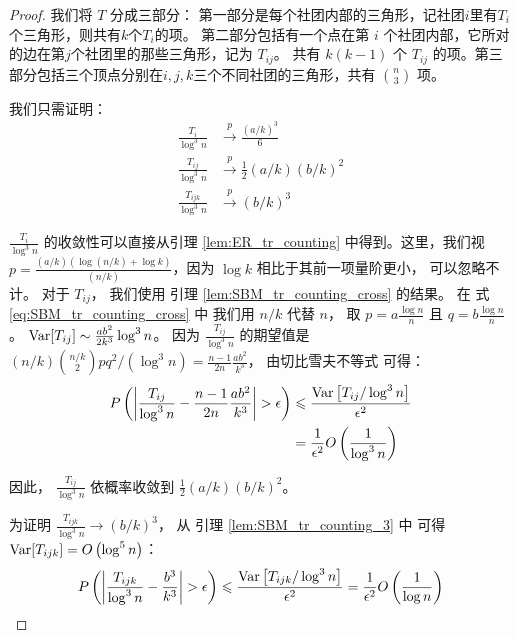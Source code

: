 \begin{proof}
 我们将 $T$ 分成三部分：
 第一部分是每个社团内部的三角形，记社团$i$里有$T_i$个三角形，则共有$k$个$T_i$的项。
 第二部分包括有一个点在第 $i$ 个社团内部，它所对的边在第$j$个社团里的那些三角形，记为 $T_{ij}$。
 共有 $k(k-1)$ 个 $T_{ij}$ 的项。第三部分包括三个顶点分别在$i,j,k$三个不同社团的三角形，共有
 $\binom{n}{3}$ 项。
	
	我们只需证明：
\begin{align}
	\frac{T_i}{\log ^3 n} &\xrightarrow{p} \frac{(a/k)^3}{6} \\
	\frac{T_{ij}}{\log^3 n}& \xrightarrow{p}\frac{1}{2}(a/k)(b/k)^2\\
	\frac{T_{ijk}}{\log^3 n} & \xrightarrow{p} (b/k)^3
	\end{align}
	
	$\frac{T_i}{\log ^3 n}$ 的收敛性可以直接从引理
 \ref{lem:ER_tr_counting} 中得到。这里，我们视$p=\frac{(a/k) (
    \log (n/k) + \log k)}{(n/k)}$，因为 $\log k$ 相比于其前一项量阶更小，
    可以忽略不计。
	对于 $T_{ij}$， 我们使用 
  引理 \ref{lem:SBM_tr_counting_cross}  的结果。
	在 式\eqref{eq:SBM_tr_counting_cross} 中
  我们用 $n/k$ 代替 $n$， 取 $p=a\frac{\log n}{n}$ 且 $q=b\frac{\log n}{n}$。
	$\operatorname{\mathrm{Var}}[T_{ij}] \sim \frac{ab^2}{2k^3} \log^3 n$。
  因为 $\frac{T_{ij}}{\log^3 n}$ 的期望值是
  $(n/k)\binom{n/k}{2}pq^2/(\log^3 n)
	=\frac{n-1}{2n}\frac{ab^2}{k^3}$， 由切比雪夫不等式
  可得：
	\begin{align*}
	P \left( \left|\frac{T_{ij}}{\log^3 n} - \frac{n-1}{2n}\frac{ab^2}{k^3} \right| > \epsilon
  \right) &\leqslant \frac{\operatorname{\mathrm{Var}}\left[T_{ij} / \log^3 n \right]}{\epsilon^2} \\
	& = \frac{1}{\epsilon^2}
	O \left( \frac{1}{\log^3 n} \right)
	\end{align*}
	
	因此， $\frac{T_{ij}}{\log^3 n} $ 依概率收敛到 $\frac{1}{2}(a/k)(b/k)^2$。
	
	为证明
  $\frac{T_{ijk}}{\log^3 n}\to (b/k)^3$，
  从 引理 \ref{lem:SBM_tr_counting_3} 中
  可得 $\operatorname{\mathrm{Var}}[T_{ijk}] = O\left(\log^5 n\right)$：
	$$
	P \left( \left|\frac{T_{ijk}}{\log^3 n} -\frac{b^3}{k^3} \right| > \epsilon
  \right) \leqslant \frac{\operatorname{\mathrm{Var}} \left[T_{ijk} / \log^3 n \right]}{\epsilon^2} = \frac{1}{\epsilon^2}
	O \left(\frac{1}{\log n} \right)
	$$
\end{proof}
